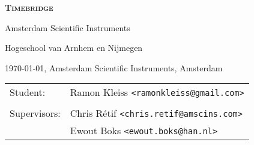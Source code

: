 \begin{titlepage}

\Huge \textsc{\bfseries Timebridge} \normalsize

\vfill

\begin{minipage}[b][1em][b]{\linewidth}
    Amsterdam Scientific Instruments
\end{minipage}

\begin{minipage}[b][1em][b]{\linewidth}
\end{minipage}

\begin{minipage}[b][1em][b]{\linewidth}
    Hogeschool van Arnhem en Nijmegen
\end{minipage}

\begin{minipage}[b][2em][b]{\linewidth}
\end{minipage}

\begin{minipage}[b][1em][b]{\linewidth}
    \today, Amsterdam Scientific Instruments, Amsterdam
\end{minipage}

\begin{minipage}[b][2em][b]{\linewidth}
\end{minipage}

\begin{minipage}[b][4em][b]{\linewidth}
    \begin{tabular}{l l }
        Student: & Ramon Kleiss \texttt{<ramonkleiss@gmail.com>} \\
        \\
        Supervisors: & Chris Rétif \texttt{<chris.retif@amscins.com>} \\
        & Ewout Boks \texttt{<ewout.boks@han.nl>} \\
    \end{tabular}
\end{minipage}

\end{titlepage}
